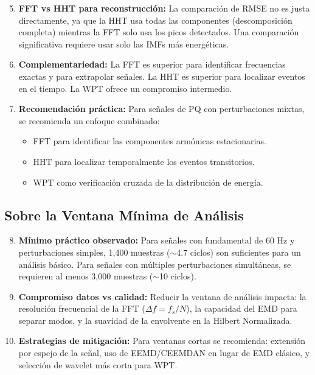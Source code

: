 \documentclass[12pt,a4paper]{article}
\begin{document}
\begin{enumerate}
\setcounter{enumi}{4}
    \item \textbf{FFT vs HHT para reconstrucción:} La comparación de RMSE no es justa directamente, ya que la HHT usa todas las componentes (descomposición completa) mientras la FFT solo usa los picos detectados. Una comparación significativa requiere usar solo las IMFs más energéticas.

    \item \textbf{Complementariedad:} La FFT es superior para identificar frecuencias exactas y para extrapolar señales. La HHT es superior para localizar eventos en el tiempo. La WPT ofrece un compromiso intermedio.

    \item \textbf{Recomendación práctica:} Para señales de PQ con perturbaciones mixtas, se recomienda un enfoque combinado:
    \begin{itemize}
        \item FFT para identificar las componentes armónicas estacionarias.
        \item HHT para localizar temporalmente los eventos transitorios.
        \item WPT como verificación cruzada de la distribución de energía.
    \end{itemize}
\end{enumerate}


\subsection{Sobre la Ventana Mínima de Análisis}

\begin{enumerate}
\setcounter{enumi}{7}
    \item \textbf{Mínimo práctico observado:} Para señales con fundamental de 60 Hz y perturbaciones simples, 1{,}400 muestras ($\sim$4.7 ciclos) son suficientes para un análisis básico. Para señales con múltiples perturbaciones simultáneas, se requieren al menos 3{,}000 muestras ($\sim$10 ciclos).

    \item \textbf{Compromiso datos vs calidad:} Reducir la ventana de análisis impacta: la resolución frecuencial de la FFT ($\Delta f = f_s/N$), la capacidad del EMD para separar modos, y la suavidad de la envolvente en la Hilbert Normalizada.

    \item \textbf{Estrategias de mitigación:} Para ventanas cortas se recomienda: extensión por espejo de la señal, uso de EEMD/CEEMDAN en lugar de EMD clásico, y selección de wavelet más corta para WPT.
\end{enumerate}
\end{document}
